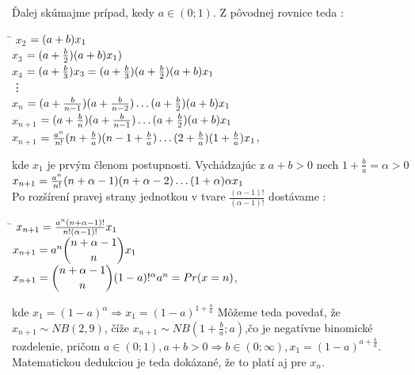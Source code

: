 \documentclass[a4paper,10pt]{article}
\theoremstyle{plain}
\theoremstyle{definition}
\begin{document}
Ďalej skúmajme prípad, kedy $ a \in (0;1) $. Z pôvodnej rovnice teda :
\begin{spacing}{1.6}
\begin{tabbing}
\hspace{0.7cm}\=\kill 
$ x_{2}$ \> $=(a+b)\*x_{1} $\\
$ x_{3}$ \> $=(a + \frac{b}{2}) \* (a + b)\*x_{1} ) $\\
$ x_{4}$ \> $=(a + \frac{b}{3})\*x_{3}= (a + \frac{b}{3})\*(a + \frac{b}{2})\*(a + b)\*x_{1} $\\
\vdots \\
$ x_{n}$ \> $=(a + \frac{b}{n-1})\*(a + \frac{b}{n-2}) \ldots (a + \frac{b}{2})\*(a + b)\*x_{1}$\\
$ x_{n+1}$ \> $=(a + \frac{b}{n})\*(a + \frac{b}{n-1}) \ldots (a + \frac{b}{2})\*(a + b)\*x_{1}$\\
$ x_{n+1}$ \> $=\frac{a^{n}}{n!}\*(n + \frac{b}{a})\*(n-1 + \frac{b}{a}) \ldots (2 + \frac{b}{a})\*(1 + \frac{b}{a})\*x_{1}$,\\
\end{tabbing} 
\end{spacing}
kde $ x_{1} $ je prvým členom postupnosti. Vychádzajúc z $ a + b > 0 $ nech $ 1 + \frac{b}{a} = \alpha > 0$\\
$ x_{n+1} = \frac{a^{n}}{n!}\*(n+\alpha-1)\*(n+\alpha-2) \ldots (1+\alpha)\*\alpha\*x_{1}$\\\newpage
Po rozšírení pravej strany jednotkou v tvare $ \frac{(\alpha-1)!}{(\alpha-1)!} $ dostávame : \\
\begin{spacing}{2.2}
\begin{tabbing}
\hspace{0.7cm}\=\kill 
$ x_{n+1} = \frac{a^{n}\*(n+\alpha-1)!}{n!\*(\alpha-1)!}\*x_{1} $\\
$ x_{n+1} = a^{n}\* \dbinom{n+\alpha-1}{n}\*x_{1} $\\	%
$ x_{n+1} = \dbinom{n+\alpha-1}{n}\*(1-a)!^{\alpha}\*a^{n} = Pr(x = n) $,
\end{tabbing} 
\end{spacing}
kde $ x_{1} = (1-a)^{\alpha} \Rightarrow x_{1} = (1-a)^{1+\frac{b}{a}}$ 
Môžeme teda povedať, že $ x_{n+1} \sim NB(2,9) $, číže $ x_{n+1}\sim NB (1+\frac{b}{a}; a) $,čo je negatívne binomické rozdelenie, pričom
$ a \in (0;1), a+b>0 \Rightarrow b \in (0;\infty), x_{1}=(1-a)^{a+\frac{b}{a}}$. Matematickou dedukciou je teda dokázané, že to platí aj pre 
$ x_{n} $.\\
\end{document}
